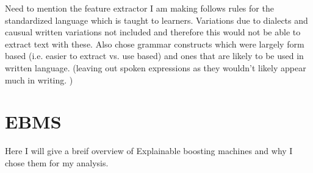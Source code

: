 Need to mention the feature extractor I am making follows rules for the standardized language which is taught to
learners. Variations due to dialects and causual written variations not included and therefore this would not be
able to extract text with these. Also chose grammar constructs which were largely form based (i.e. easier to extract
vs. use based) and ones that are likely to be used in written language. (leaving out spoken expressions as they
wouldn't likely appear much in writing. )

\section{EBMS}
 Here I will give a breif overview of Explainable boosting machines and why I chose them for my analysis.






